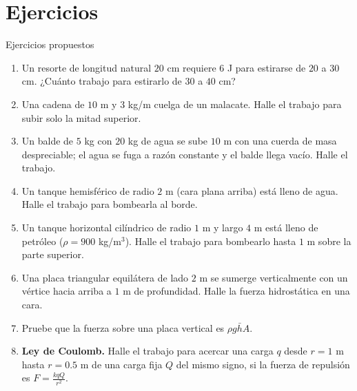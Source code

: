 \documentclass[10pt,aspectratio=169]{beamer}
\begin{document}
\section{Ejercicios}

\begin{frame}{Ejercicios propuestos}
  \small
  \begin{ejercicio}
    \begin{enumerate}
      \item Un resorte de longitud natural $20$ cm requiere $6$ J para estirarse de $20$ a $30$ cm. ¿Cuánto trabajo para
        estirarlo de $30$ a $40$ cm?
      \item Una cadena de $10$ m y $3$ kg/m cuelga de un malacate. Halle el trabajo para subir solo la mitad superior.
      \item Un balde de $5$ kg con $20$ kg de agua se sube $10$ m con una cuerda de masa despreciable; el agua se fuga a razón constante
        y el balde llega vacío. Halle el trabajo.
      \item Un tanque hemisférico de radio $2$ m (cara plana arriba) está lleno de agua. Halle el trabajo para bombearla al borde.
      \item Un tanque horizontal cilíndrico de radio $1$ m y largo $4$ m está lleno de petróleo ($\rho=900$ kg/m$^3$). Halle el
        trabajo para bombearlo hasta $1$ m sobre la parte superior.
      \item Una placa triangular equilátera de lado $2$ m se sumerge verticalmente con un vértice hacia arriba a $1$ m de
        profundidad. Halle la fuerza hidrostática en una cara.
      \item Pruebe que la fuerza sobre una placa vertical es $\rho g\bar hA$.
      \item \textbf{Ley de Coulomb.} Halle el trabajo para acercar una carga $q$ desde $r=1$ m hasta $r=0.5$ m de una carga
        fija $Q$ del mismo signo, si la fuerza de repulsión es $F=\frac{kqQ}{r^2}$.
    \end{enumerate}
  \end{ejercicio}
\end{frame}
\end{document}

